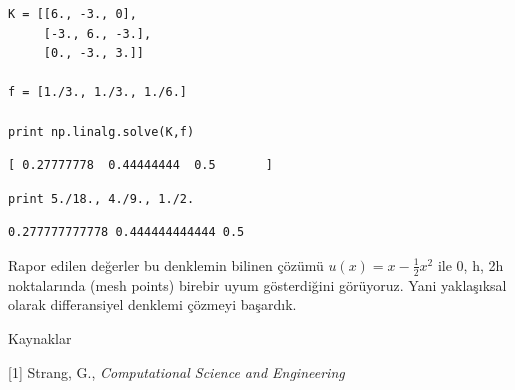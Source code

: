 \documentclass[12pt,fleqn]{article}\usepackage{../../common}
\begin{document}
\begin{verbatim}
K = [[6., -3., 0],
     [-3., 6., -3.],
     [0., -3., 3.]]

f = [1./3., 1./3., 1./6.]

print np.linalg.solve(K,f)
\end{verbatim}

\begin{verbatim}
[ 0.27777778  0.44444444  0.5       ]
\end{verbatim}

\begin{verbatim}
print 5./18., 4./9., 1./2.
\end{verbatim}

\begin{verbatim}
0.277777777778 0.444444444444 0.5
\end{verbatim}

Rapor edilen değerler bu denklemin bilinen çözümü $u(x) = x - \frac{1}{2}x^2$ 
ile 0, h, 2h noktalarında (mesh points) birebir uyum gösterdiğini
görüyoruz.  Yani yaklaşıksal olarak differansiyel denklemi çözmeyi 
başardık.

Kaynaklar

[1] Strang, G., {\em Computational Science and Engineering}
\end{document}
